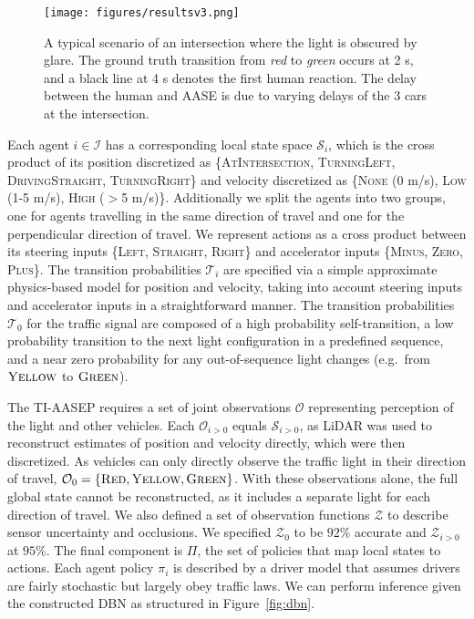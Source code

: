\documentclass[letterpaper,10pt,conference]{ieeeconf}
\begin{document}
\begin{figure*}[t]
    \centering
    \texttt{[image: figures/resultsv3.png]}
    \caption{A typical scenario of an intersection where the light is obscured by glare. The ground truth transition from \emph{red} to \emph{green} occurs at 2 s, and a black line at 4 s denotes the first human reaction. The delay between the human and AASE is due to varying delays of the 3 cars at the intersection.}
    \label{fig:results}
\end{figure*}

Each agent $i \in \mathcal{I}$ has a corresponding local state space $\mathcal{S}_i$, which is the cross product of its position discretized as \{\textsc{AtIntersection}, \textsc{TurningLeft}, \textsc{DrivingStraight}, \textsc{TurningRight}\} and velocity discretized as \{\textsc{None} (0 m/s), \textsc{Low} (1-5 m/s), \textsc{High} ($>$5 m/s)\}. Additionally we split the agents into two groups, one for agents travelling in the same direction of travel and one for the perpendicular direction of travel. We represent actions as a cross product between its steering inputs \{\textsc{Left}, \textsc{Straight}, \textsc{Right}\} and accelerator inputs \{\textsc{Minus}, \textsc{Zero}, \textsc{Plus}\}. The transition probabilities $\mathcal{T}_i$ are specified via a simple approximate physics-based model for position and velocity, taking into account steering inputs and accelerator inputs in a straightforward manner. The transition probabilities $\mathcal{T}_0$ for the traffic signal are composed of a high probability self-transition, a low probability transition to the next light configuration in a predefined sequence, and a near zero probability for any out-of-sequence light changes (e.g.\ from $\textsc{Yellow}$ to $\textsc{Green}$).

The TI-AASEP requires a set of joint observations $\mathcal{O}$ representing perception of the light and other vehicles. Each $\mathcal{O}_{i>0}$ equals $\mathcal{S}_{i>0}$, as LiDAR was used to reconstruct estimates of position and velocity directly, which were then discretized. As vehicles can only directly observe the traffic light in their direction of travel, $\mathcal{O}_0 = \{ \textsc{Red}, \textsc{Yellow}, \textsc{Green}\}$. With these observations alone, the full global state cannot be reconstructed, as it includes a separate light for each direction of travel. We also defined a set of observation functions $\mathcal{Z}$ to describe sensor uncertainty and occlusions. We specified $\mathcal{Z}_0$ to be $92\%$ accurate and $\mathcal{Z}_{i>0}$ at $95\%$. The final component is $\Pi$, the set of policies that map local states to actions. Each agent policy $\pi_i$ is described by a driver model that assumes drivers are fairly stochastic but largely obey traffic laws. We can perform inference given the constructed DBN as structured in Figure~\ref{fig:dbn}.
\end{document}
